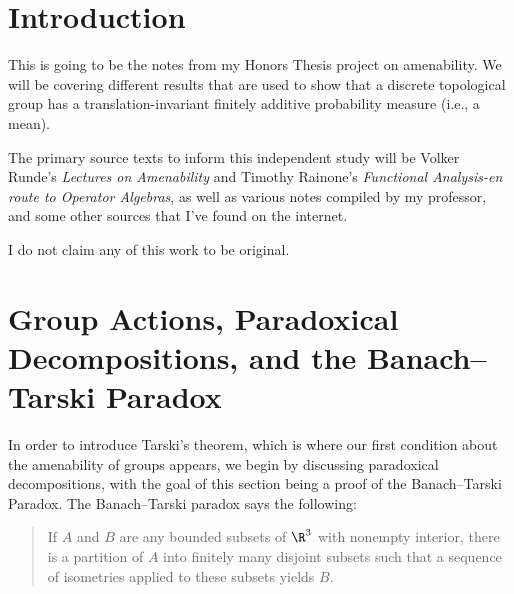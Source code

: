 \documentclass[10pt]{mypackage}
\begin{document}
\RaggedRight
\tableofcontents
\section{Introduction}%
This is going to be the notes from my Honors Thesis project on amenability. We will be covering different results that are used to show that a discrete topological group has a translation-invariant finitely additive probability measure (i.e., a mean).\newline

The primary source texts to inform this independent study will be Volker Runde's \textit{Lectures on Amenability} and Timothy Rainone's \textit{Functional Analysis-en route to Operator Algebras}, as well as various notes compiled by my professor, and some other sources that I've found on the internet.\newline

I do not claim any of this work to be original.
\section{Group Actions, Paradoxical Decompositions, and the Banach--Tarski Paradox}%
In order to introduce Tarski's theorem, which is where our first condition about the amenability of groups appears, we begin by discussing paradoxical decompositions, with the goal of this section being a proof of the Banach--Tarski Paradox. The Banach--Tarski paradox says the following:
\begin{quote}
  If $A$ and $B$ are any bounded subsets of $\R^{3}$ with nonempty interior, there is a partition of $A$ into finitely many disjoint subsets such that a sequence of isometries applied to these subsets yields $B$.
\end{quote}
\end{document}
